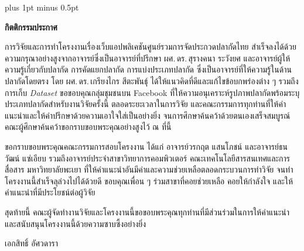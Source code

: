 
\clearpage

\begingroup
\fontsize{16pt}{19.2pt}\selectfont

\justifying
\XeTeXlinebreakskip=0pt plus 1pt minus 0.5pt

\setlength{\parindent}{1.5cm}
\setlength{\parskip}{0pt}

\vspace*{-\topskip}\vspace*{\baselineskip}

{}

\begin{center}
	\textbf{กิตติกรรมประกาศ}
\end{center}

\vspace{\baselineskip}

การวิจัยและการทำโครงงานเรื่องเว็บแอปพลิเคชันศูนย์รวมการจัดประกวดปลากัดไทย
สำเร็จลงได้ด้วยความกรุณาอย่างสูงจากอาจารย์ซึ่งเป็นอาจารย์ที่ปรึกษา
ผศ.\,ดร.\,สุรางคนา ระวังยศ และอาจารย์ผู้ให้ความรู้เกี่ยวกับปลากัด การคัดแยกปลากัด
การแบ่งประเภทปลากัด ซึ่งเป็นอาจารย์ที่ให้ความรู้ในด้านปลากัดโดยตรง
โดย ผศ.\,ดร.\,เกรียงไกร สีตะพันธุ์ ได้ให้แนวคิดที่ดีและแก้ไขข้อบกพร่องต่าง ๆ
รวมถึงการเก็บ \textit{Dataset} ขอขอบคุณกลุ่มชุมชนบน Facebook
ที่ให้ความอนุเคราะห์รูปภาพปลากัดพร้อมระบุประเภทปลากัดสำหรับงานวิจัยครั้งนี้
ตลอดระยะเวลาในการวิจัย และคณะกรรมการทุกท่านที่ให้คำแนะนำและให้คำปรึกษาด้วยความเอาใจใส่เป็นอย่างยิ่ง
จนการศึกษาค้นคว้าด้วยตนเองเสร็จสมบูรณ์ คณะผู้ศึกษาค้นคว้าขอกราบขอบพระคุณอย่างสูงไว้ ณ ที่นี้

\par ขอกราบขอบพระคุณคณะกรรมการสอบโครงงาน ได้แก่ อาจารย์วรกฤต แสนโภชน์
และอาจารย์ธนวัฒน์ แซ่เอียบ รวมถึงอาจารย์ประจำสาขาวิทยาการคอมพิวเตอร์
คณะเทคโนโลยีสารสนเทศและการสื่อสาร มหาวิทยาลัยพะเยา
ที่ให้คำแนะนำอันมีค่าและความช่วยเหลือตลอดกระบวนการทำวิจัย
จนทำโครงงานนี้สำเร็จลุล่วงไปได้ด้วยดี ขอบคุณเพื่อน ๆ ร่วมสาขาที่คอยช่วยเหลือ
คอยให้กำลังใจ และให้คำแนะนำที่มีประโยชน์ต่อผู้วิจัย

\par สุดท้ายนี้ คณะผู้จัดทำงานวิจัยและโครงงานนี้ขอขอบพระคุณทุกท่านที่มีส่วนร่วมในการให้คำแนะนำ
และสนับสนุนโครงงานนี้ด้วยความซาบซึ้งอย่างยิ่ง

\vspace{\baselineskip}
\begin{flushright}
	เอกสิทธิ์ อัศวดารา
\end{flushright}

\par\endgroup
\clearpage

